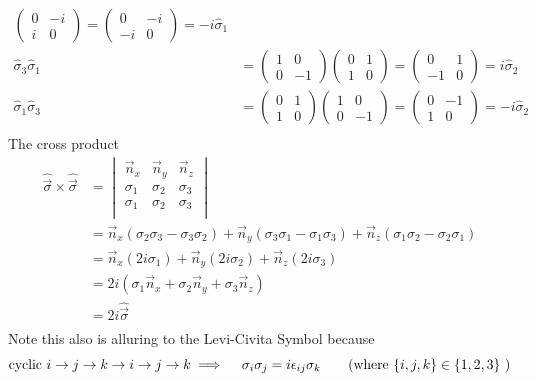 \documentclass[letter]{article}
\begin{document}
\begin{align*}
	\begin{pmatrix} 0&-i\\i&0 \end{pmatrix} = 
\begin{pmatrix} 0&-i\\-i&0 \end{pmatrix} = -i \hat{\sigma}_1 \\ 
\hat{\sigma}_3 \hat{\sigma}_1  &= 
\begin{pmatrix} 1&0\\0&-1  \end{pmatrix} 
\begin{pmatrix} 0&1\\1&0 \end{pmatrix} 
= \begin{pmatrix} 0&1\\-1&0 \end{pmatrix}  = i \hat{\sigma}_2 \\ 
\hat{\sigma}_1 \hat{\sigma}_3  &= 
\begin{pmatrix} 0&1\\1&0 \end{pmatrix} 
\begin{pmatrix} 1&0\\0&-1  \end{pmatrix} 
= \begin{pmatrix} 0&-1\\1&0 \end{pmatrix}  = -i \hat{\sigma}_2 \\ 
\end{align*}
The cross product 
\begin{align*}
	\hat{\vec{\sigma}} \times \hat{\vec{\sigma}} 
&= \begin{vmatrix} \vec{n}_x & \vec{n}_y & \vec{n}_z \\
\sigma_1 & \sigma_2 & \sigma_3 \\ 
\sigma_1 & \sigma_2 & \sigma_3 \\ 
\end{vmatrix}  \\
	&= \vec{n}_x \left(\sigma_2 \sigma_3 - \sigma_3 \sigma_2\right) + \vec{n}_y \left(\sigma_3 \sigma_1 - \sigma_1 \sigma_3 \right) + \vec{n}_z \left(\sigma_1 \sigma_2 - \sigma_2 \sigma_1\right)  \\ 
	&= \vec{n}_x (2 i \sigma_1) + \vec{n}_y \left( 2 i \sigma_2\right) + \vec{n}_z \left(2 i \sigma_3\right) \\
	&= 2 i \left(\sigma_1 \vec{n}_x + \sigma_2 \vec{n}_y + \sigma_3 \vec{n}_z\right) \\
	&= 2 i \hat{\vec{\sigma}} \\
\end{align*}
Note this also is alluring to the Levi-Civita Symbol because 
\[ \text{cyclic }
i \to j \to k \to i \to j \to  k \implies
	\quad \sigma_i \sigma_j = i\epsilon_{ij} \sigma_k \tag{where $\{i,j,k\} \in \{1,2,3\} $ }
\]
\end{document}
